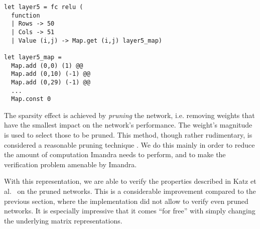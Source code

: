 \documentclass[runningheads]{llncs}
\begin{document}
\begin{lstlisting}[language=caml]
let layer5 = fc relu (
  function
  | Rows -> 50
  | Cols -> 51
  | Value (i,j) -> Map.get (i,j) layer5_map)

let layer5_map =
  Map.add (0,0) (1) @@
  Map.add (0,10) (-1) @@
  Map.add (0,29) (-1) @@
  ...
  Map.const 0
\end{lstlisting}

\noindent The sparsity effect is achieved by \emph{pruning} the network, i.e. removing weights that have the smallest impact on the network's performance. The weight's magnitude is used to select those to be pruned. This method, though rather rudimentary, is considered a reasonable pruning technique \cite{lecun_optimal_1989}.
%
We do this mainly in order to reduce the amount of computation Imandra needs to perform, and to make the verification problem amenable by Imandra.

With this representation, we are able to verify the properties described in Katz et al.~\cite{KaBaDiJuKo17Reluplex} on the pruned networks.
This is a considerable improvement compared to the previous section, where the implementation did not allow to verify even pruned networks. It is especially impressive that it comes ``for free'' with simply changing the underlying matrix representations.
\end{document}
